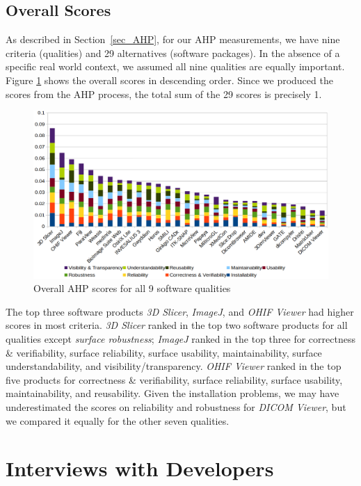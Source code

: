 \documentclass[final, 3p, times, authoryear]{elsarticle}
\begin{document}
\subsection{Overall Scores}

As described in Section~\ref{sec_AHP}, for our AHP measurements, we have nine
criteria (qualities) and 29 alternatives (software packages). In the absence of
a specific real world context, we assumed all nine qualities are equally
important. Figure \ref{fg_overall_scores} shows the overall scores in descending
order. Since we produced the scores from the AHP process, the total sum of the
29 scores is precisely 1.

\begin{figure}[!ht]
\includegraphics[scale=0.38]{figures/overall_scores.png}
\caption{Overall AHP scores for all 9 software qualities}

\label{fg_overall_scores}
\end{figure}

The top three software products \textit{3D Slicer}, \textit{ImageJ}, and
\textit{OHIF Viewer} had higher scores in most criteria. \textit{3D Slicer}
ranked in the top two software products for all qualities except \textit{surface
robustness}; \textit{ImageJ} ranked in the top three for correctness \&
verifiability, surface reliability, surface usability, maintainability, surface
understandability, and visibility/transparency. \textit{OHIF Viewer} ranked in
the top five products for correctness \& verifiability, surface reliability,
surface usability, maintainability, and reusability. Given the installation
problems, we may have underestimated the scores on reliability and robustness
for \textit{DICOM Viewer}, but we compared it equally for the other seven
qualities.

\section{Interviews with Developers} \label{ch_interview}
\end{document}
